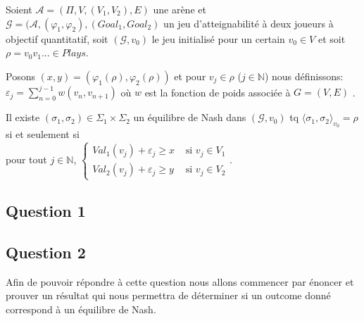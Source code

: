 \begin{propriete}
	\label{prop:outEN2}
	Soient $\mathcal{A} = (\Pi, V, (V_{1}, V_{2}), E)$ une arène et $\mathcal{G} = (\mathcal{A}, (\varphi _{1}, \varphi _{2}), (Goal_{1}, Goal_{2})$ un jeu d'atteignabilité à deux joueurs à objectif quantitatif, soit $(\mathcal{G}, v_{0})$ le jeu initialisé pour un certain $v_{0} \in V $ et soit $\rho = v_{0}v_{1}... \in Plays$. 
	
	Posons $(x,y) = (\varphi _{1}(\rho), \varphi _{2}(\rho))$ et pour $v_{j} \in \rho$ ($j \in \mathbb{N}$) nous définissons: $\varepsilon _{j} = \sum _{n= 0} ^{j-1} w(v_{n},v_{n+1})$ où $w$ est la fonction de poids associée à $G = (V,E)$ .
	
	\begin{center}Il existe $(\sigma _{1},\sigma _{2}) \in \Sigma _{1} \times \Sigma _{2}$ un équilibre de Nash dans $(\mathcal{G},v_{0})$ tq $\langle \sigma _{1},\sigma _{2}\rangle_{v_0} = \rho$\\ $\text{}$\\ si et seulement si\\$\text{}$\\ pour tout $j \in \mathbb{N}$, $\begin{cases}
													Val_{1}(v_{j}) + \varepsilon _{j} \geq x & \text{ si } v_{j} \in V_{1} \\
													Val_{2}(v_{j}) + \varepsilon _{j} \geq y & \text{ si } v_{j} \in V_{2} 
													\end{cases}$.\end{center}  
\end{propriete}
	
\subsection{Question 1}
\subsection{Question 2}
Afin de pouvoir répondre à cette question nous allons commencer par énoncer et prouver un résultat qui nous permettra de déterminer si un outcome donné correspond à un équilibre de Nash.

